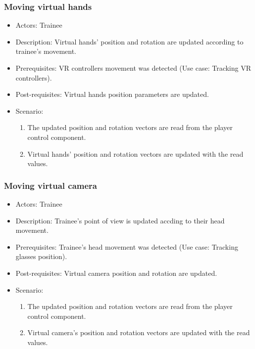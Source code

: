 \subsubsection{Moving virtual hands}

\begin{itemize}
\item Actors: Trainee
\item Description: Virtual hands' position and rotation are updated according to trainee's movement.
\item Prerequisites: VR controllers movement was detected (Use case: Tracking VR controllers).
\item Post-requisites: Virtual hands position parameters are updated.
\item Scenario: 
\begin{enumerate}
    \item The updated position and rotation vectors are read from the player control component.
    \item Virtual hands' position and rotation vectors are updated with the read values. 
\end{enumerate}

\end{itemize}

\subsubsection{Moving virtual camera}

\begin{itemize}
\item Actors: Trainee
\item Description: Trainee's point of view is updated accding to their head movement.
\item Prerequisites: Trainee's head movement was detected (Use case: Tracking glasses position).
\item Post-requisites: Virtual camera position and rotation are updated.
\item Scenario: 
\begin{enumerate}
    \item The updated position and rotation vectors are read from the player control component.
    \item Virtual camera's position and rotation vectors are updated with the read values. 
\end{enumerate}

\end{itemize}

